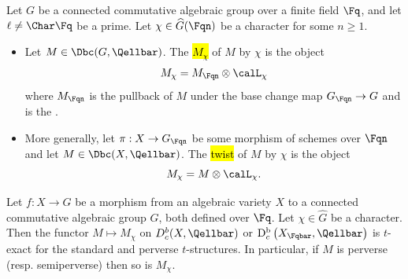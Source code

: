 



\begin{definition}
Let $G$ be a connected commutative algebraic group over a finite field $\Fq$, and let $\ell \neq \Char \Fq$ be a prime. Let $\chi \in \widehat{G}(\Fqn)$ be a character for some $n \geq 1$.  
\begin{itemize}
    \item Let $M \in \Dbc(G, \Qellbar)$. The  \hl{$M_\chi$} of $M$ by $\chi$ is the object 
    $$M_\chi = M_{\Fqn} \otimes \calL_{\chi}$$
    where $M_{\Fqn}$ is the pullback of $M$ under the base change map $G_{\Fqn} \to G$ and  is the .

    \item More generally, let $\pi: X \to G_{\Fqn}$ be some morphism of schemes over $\Fqn$ and let $M \in \Dbc(X, \Qellbar)$. The \hl{twist}  of $M$ by $\chi$ is the object
    $$M_\chi = M \otimes \calL_\chi.$$
\end{itemize} 
\end{definition}

\begin{lemma} \label{lemma:twisting_cohomologically_bounded_derived_object_on_a_scheme_over_a_finite_field_by_a_character_on_a_connected_commutative_group_scheme_is_t_exact_in_the_standard_and_perverse_t_structures}
    Let $f: X \rightarrow G$ be a morphism from an algebraic variety $X$ to a connected commutative algebraic group $G$, both defined over $\Fq$. Let $\chi \in \widehat{G}$ be a character. Then the functor $M \mapsto M_\chi$ on $D_c^{b}(X, \Qellbar)$ or $\mathrm{D}_c^{\mathrm{b}}\left(X_{\Fqbar}, \Qellbar\right)$ is $t$-exact for the standard and perverse $t$-structures. In particular, if $M$ is perverse (resp. semiperverse) then so is $M_\chi$.
\end{lemma}

